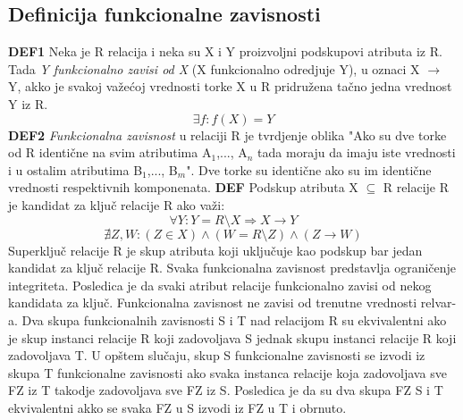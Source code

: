 \documentclass{article}
\begin{document}
\subsection{Definicija funkcionalne zavisnosti}
\textbf{DEF1} Neka je R relacija i neka su X i Y proizvoljni
podskupovi atributa iz R. Tada \textit{Y funkcionalno zavisi od X}
(X funkcionalno odredjuje Y), u oznaci X $\rightarrow$ Y, akko je
svakoj važećoj vrednosti torke X u R pridružena tačno jedna vrednost 
Y iz R.
$$ \exists f : f(X) = Y $$
\textbf{DEF2} \textit{Funkcionalna zavisnost} u relaciji R je
tvrdjenje oblika "Ako su dve torke od R identične na svim atributima
A$_1$,..., A$_n$ tada moraju da imaju iste vrednosti i u ostalim
atributima B$_1$,..., B$_m$". Dve torke su identične ako su im
identične vrednosti respektivnih komponenata.
\vspace{0.2cm} \newline
\textbf{DEF} Podskup atributa X $\subseteq$ R relacije R je kandidat za ključ relacije R ako važi: 
$$ \forall Y : Y = R\setminus X \Longrightarrow X \rightarrow Y $$
$$ \nexists Z, W : (Z\in X) \wedge (W = R \setminus Z) \wedge
(Z \rightarrow W) $$
Superključ relacije R je skup atributa koji uključuje kao podskup bar
jedan kandidat za ključ relacije R.
\newline
Svaka funkcionalna zavisnost predstavlja ograničenje integriteta.
Posledica je da svaki atribut relacije funkcionalno zavisi od nekog
kandidata za ključ. Funkcionalna zavisnost ne zavisi od trenutne
vrednosti relvar-a.
\newline
Dva skupa funkcionalnih zavisnosti S i T nad relacijom R su
ekvivalentni ako je skup instanci relacije R koji zadovoljava S
jednak skupu instanci relacije R koji zadovoljava T. U opštem
slučaju, skup S funkcionalne zavisnosti se izvodi iz skupa T
funkcionalne zavisnosti ako svaka instanca relacije koja zadovoljava
sve FZ iz T takodje zadovoljava sve FZ iz S. Posledica je da su dva
skupa FZ S i T ekvivalentni akko se svaka FZ u S izvodi iz FZ u T i
obrnuto.
\end{document}
